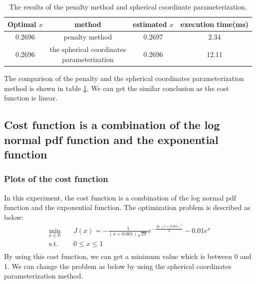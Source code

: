 \documentclass[a4paper,12pt]{article}
\begin{document}

\begin{table}[!ht]
\begin{center}
\begin{tabular}{|c|c|c|c|}
\hline
Optimal $x$& method & estimated $x$&execution time(ms)\\
\hline
0.2696& penalty method&0.2697&2.34\\
\hline
0.2696&  \makecell{ the spherical coordinates \\parameterization}&0.2696&12.11\\

\hline
\end{tabular}
\end{center}
\caption{The results of the penalty method and spherical coordinate parameterization.}
\label{tab:poly}
\end{table}


The comparison of the penalty and the spherical coordinates parameterization method is shown in table \ref{tab:poly}. We can get the similar conclusion as the cost function is linear. \\

\subsection{Cost function is a combination of the log normal pdf function and the exponential function }
\subsubsection{Plots of the cost function }
In this experiment, the cost function is  a combination of the log normal pdf function and the exponential function. The optimization problem is described as below:\\
\begin{equation}\label{eq:exp2}
\begin{aligned}
\min_{x\in \mathbb{R}} \quad &J(x) =-\frac{1}{(x+0.001) \sqrt{2 \pi}}e^{-\frac{\ln(x+0.001)^2}{2} }-0.01 e^x \\
\textrm{s.t.} \quad & 0 \leq x \leq 1\\
\end{aligned}
\end{equation}
By using this cost function, we can get a minimum value which is between 0 and 1. We can change the problem as below by using the spherical coordinates parameterization method.\\
\end{document}
